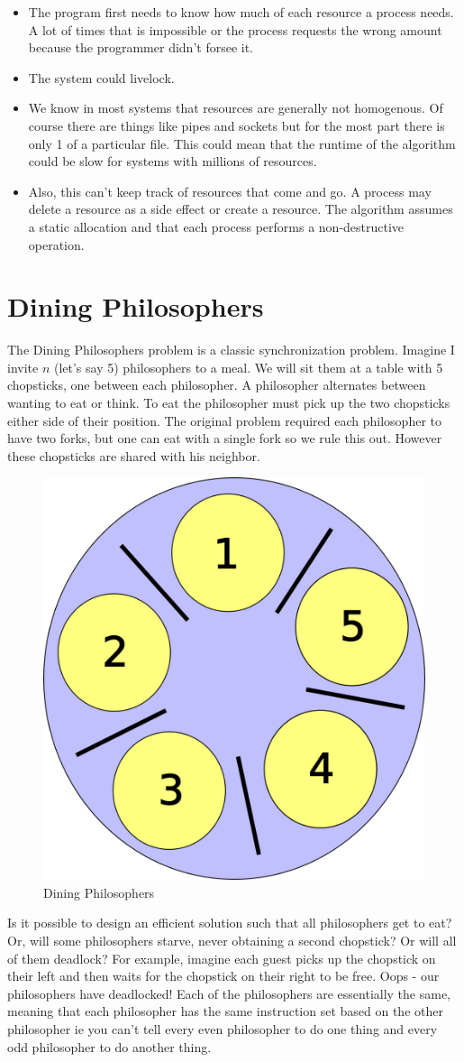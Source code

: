 \begin{itemize}
\item The program first needs to know how much of each resource a process needs. A lot of times that is impossible or the process requests the wrong amount because the programmer didn't forsee it. 
\item The system could livelock. 
\item We know in most systems that resources are generally not homogenous. Of course there are things like pipes and sockets but for the most part there is only 1 of a particular file. This could mean that the runtime of the algorithm could be slow for systems with millions of resources.
\item Also, this can't keep track of resources that come and go. A process may delete a resource as a side effect or create a resource. The algorithm assumes a static allocation and that each process performs a non-destructive operation.
\end{itemize}

\section{Dining Philosophers}

The Dining Philosophers problem is a classic synchronization problem. Imagine I invite $n$ (let's say 5) philosophers to a meal. We will sit them at a table with 5 chopsticks, one between each philosopher. A philosopher alternates between wanting to eat or think. To eat the philosopher must pick up the two chopsticks either side of their position. The original problem required each philosopher to have two forks, but one can eat with a single fork so we rule this out. However these chopsticks are shared with his neighbor.

\begin{figure}
  \begin{center}
\includegraphics[width=.2\textwidth]{deadlock/images/5DiningPhilosophers.png}
\end{center}
  \caption{Dining Philosophers}
\end{figure}

Is it possible to design an efficient solution such that all philosophers get to eat? Or, will some philosophers starve, never obtaining a second chopstick? Or will all of them deadlock? For example, imagine each guest picks up the chopstick on their left and then waits for the chopstick on their right to be free. Oops - our philosophers have deadlocked! Each of the philosophers are essentially the same, meaning that each philosopher has the same instruction set based on the other philosopher ie you can't tell every even philosopher to do one thing and every odd philosopher to do another thing.

